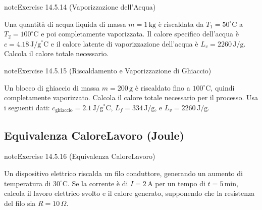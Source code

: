 \documentclass[letterpaper,10pt,italian]{jupyterBook}
\begin{document}
\begin{sphinxadmonition}{note}{Exercise 14.5.14 (Vaporizzazione dell’Acqua)}



\sphinxAtStartPar
Una quantità di acqua liquida di massa \(m = 1 \, \text{kg}\) è riscaldata da \(T_1 = 50^\circ \text{C}\) a \(T_2 = 100^\circ \text{C}\) e poi completamente vaporizzata. Il calore specifico dell’acqua è \(c = 4.18 \, \text{J/g}^\circ \text{C}\) e il calore latente di vaporizzazione dell’acqua è \(L_v = 2260 \, \text{J/g}\). Calcola il calore totale necessario.
\end{sphinxadmonition}
 \label{exercise:ch/thermodynamics/foundation-problems-exercise-14}

\begin{sphinxadmonition}{note}{Exercise 14.5.15 (Riscaldamento e Vaporizzazione di Ghiaccio)}



\sphinxAtStartPar
Un blocco di ghiaccio di massa \(m = 200 \, \text{g}\) è riscaldato fino a \(100^\circ \text{C}\), quindi completamente vaporizzato. Calcola il calore totale necessario per il processo. Usa i seguenti dati: \(c_{\text{ghiaccio}} = 2.1 \, \text{J/g}^\circ \text{C}\), \(L_f = 334 \, \text{J/g}\), e \(L_v = 2260 \, \text{J/g}\).
\end{sphinxadmonition}


\subsection{Equivalenza Calore\sphinxhyphen{}Lavoro (Joule)}
\label{\detokenize{ch/thermodynamics/foundation-problems:equivalenza-calore-lavoro-joule}} \label{exercise:ch/thermodynamics/foundation-problems-exercise-15}

\begin{sphinxadmonition}{note}{Exercise 14.5.16 (Equivalenza Calore\sphinxhyphen{}Lavoro)}



\sphinxAtStartPar
Un dispositivo elettrico riscalda un filo conduttore, generando un aumento di temperatura di \(30^\circ \text{C}\). Se la corrente è di \(I = 2 \, \text{A}\) per un tempo di \(t = 5 \, \text{min}\), calcola il lavoro elettrico svolto e il calore generato, supponendo che la resistenza del filo sia \(R = 10 \, \Omega\).
\end{sphinxadmonition}
 \label{exercise:ch/thermodynamics/foundation-problems-exercise-16}
\end{document}
